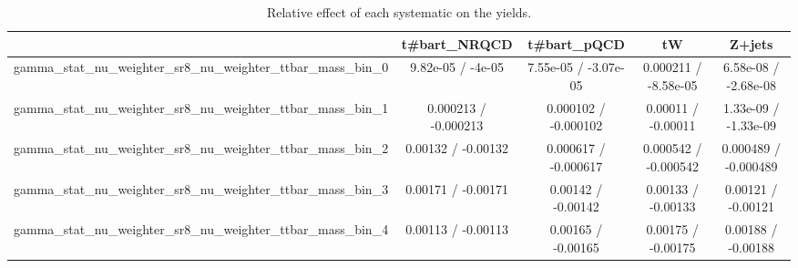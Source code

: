 \documentclass[10pt]{article}
\begin{document}
\begin{table}[htbp]
\begin{center}
\begin{tabular}{|c|c|c|c|c|}
\hline 
      & t#bar{t}_{NRQCD}      & t#bar{t}_{pQCD}      & tW      & Z+jets \\ 
\hline 
  gamma_stat_nu_weighter_sr8_nu_weighter_ttbar_mass_bin_0 & 9.82e-05 / -4e-05 & 7.55e-05 / -3.07e-05 & 0.000211 / -8.58e-05 & 6.58e-08 / -2.68e-08 \\ 
  gamma_stat_nu_weighter_sr8_nu_weighter_ttbar_mass_bin_1 & 0.000213 / -0.000213 & 0.000102 / -0.000102 & 0.00011 / -0.00011 & 1.33e-09 / -1.33e-09 \\ 
  gamma_stat_nu_weighter_sr8_nu_weighter_ttbar_mass_bin_2 & 0.00132 / -0.00132 & 0.000617 / -0.000617 & 0.000542 / -0.000542 & 0.000489 / -0.000489 \\ 
  gamma_stat_nu_weighter_sr8_nu_weighter_ttbar_mass_bin_3 & 0.00171 / -0.00171 & 0.00142 / -0.00142 & 0.00133 / -0.00133 & 0.00121 / -0.00121 \\ 
  gamma_stat_nu_weighter_sr8_nu_weighter_ttbar_mass_bin_4 & 0.00113 / -0.00113 & 0.00165 / -0.00165 & 0.00175 / -0.00175 & 0.00188 / -0.00188 \\ 
\hline 
\end{tabular} 
\caption{Relative effect of each systematic on the yields.} 
\end{center} 
\end{table} 
\end{document}
